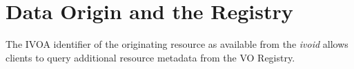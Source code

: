 \documentclass[11pt,a4paper]{ivoa}
\begin{document}
%
%
%
%
%

\section{Data Origin and the Registry}
\label{sect:registry}

The IVOA identifier of the originating resource as available from the
\emph{ivoid}  allows clients to query additional resource metadata
from the VO Registry.
\end{document}

